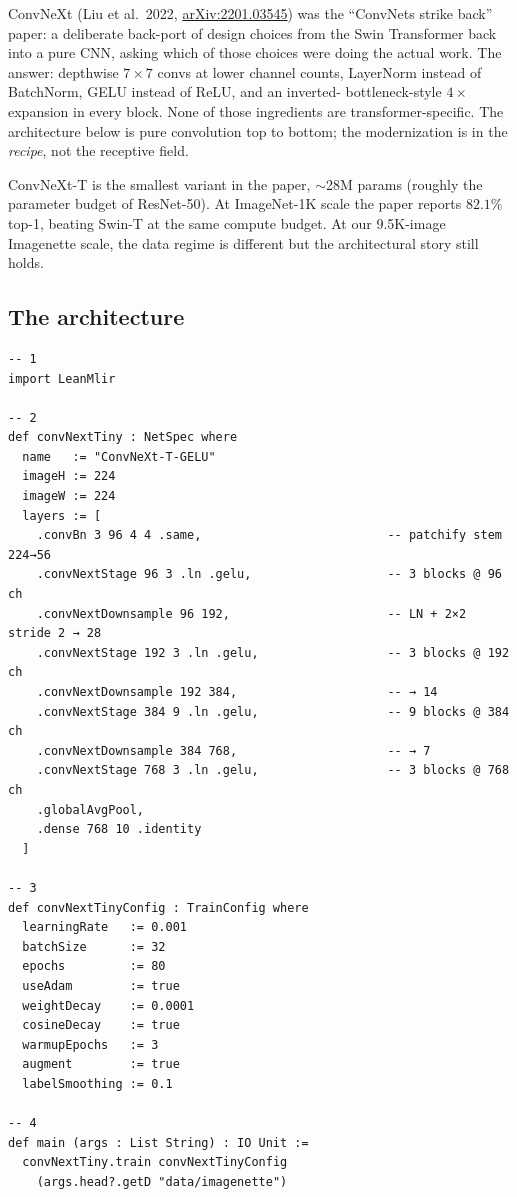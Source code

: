 ConvNeXt (Liu et al.\ 2022,
\href{https://arxiv.org/abs/2201.03545}{arXiv:2201.03545}) was the
``ConvNets strike back'' paper: a deliberate back-port of design
choices from the Swin Transformer back into a pure CNN, asking
which of those choices were doing the actual work. The answer:
depthwise $7 \times 7$ convs at lower channel counts, LayerNorm
instead of BatchNorm, GELU instead of ReLU, and an inverted-
bottleneck-style $4\times$ expansion in every block. None of those
ingredients are transformer-specific. The architecture below is
pure convolution top to bottom; the modernization is in the
\emph{recipe}, not the receptive field.

ConvNeXt-T is the smallest variant in the paper, $\sim$28M params
(roughly the parameter budget of ResNet-50). At ImageNet-1K scale
the paper reports $82.1\%$ top-1, beating Swin-T at the same
compute budget. At our 9.5K-image Imagenette scale, the data
regime is different but the architectural story still holds.

\subsection*{The architecture}

\begin{verbatim}
-- 1
import LeanMlir

-- 2
def convNextTiny : NetSpec where
  name   := "ConvNeXt-T-GELU"
  imageH := 224
  imageW := 224
  layers := [
    .convBn 3 96 4 4 .same,                          -- patchify stem 224→56
    .convNextStage 96 3 .ln .gelu,                   -- 3 blocks @ 96 ch
    .convNextDownsample 96 192,                      -- LN + 2×2 stride 2 → 28
    .convNextStage 192 3 .ln .gelu,                  -- 3 blocks @ 192 ch
    .convNextDownsample 192 384,                     -- → 14
    .convNextStage 384 9 .ln .gelu,                  -- 9 blocks @ 384 ch
    .convNextDownsample 384 768,                     -- → 7
    .convNextStage 768 3 .ln .gelu,                  -- 3 blocks @ 768 ch
    .globalAvgPool,
    .dense 768 10 .identity
  ]

-- 3
def convNextTinyConfig : TrainConfig where
  learningRate   := 0.001
  batchSize      := 32
  epochs         := 80
  useAdam        := true
  weightDecay    := 0.0001
  cosineDecay    := true
  warmupEpochs   := 3
  augment        := true
  labelSmoothing := 0.1

-- 4
def main (args : List String) : IO Unit :=
  convNextTiny.train convNextTinyConfig
    (args.head?.getD "data/imagenette")
\end{verbatim}

